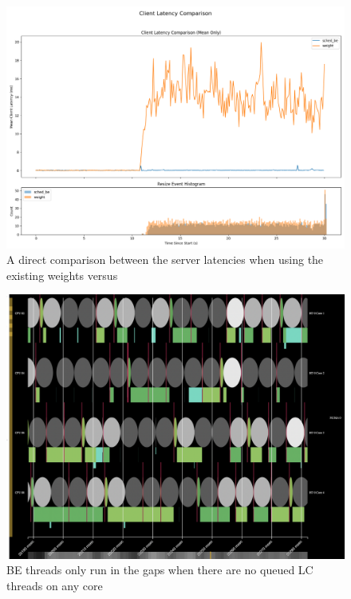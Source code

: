 \begin{figure}[t]
    \centering
    \includegraphics[width=\columnwidth]{graphs/srv-bg-cmp-unedited-schedbe.png}
    \caption{A direct comparison between the server latencies when using the
    existing \cgroups{} weights versus \schedbe{} }\label{fig:srv-bg-cmp-unedited-schedbe}
\end{figure}

\begin{figure}[t]
    \centering
    \includegraphics[width=\columnwidth]{graphs/schedviz-schedbe.png}
    \caption{BE threads only run in the gaps when there are no queued LC threads
    on any core }\label{fig:schedviz-schedbe}
\end{figure}

